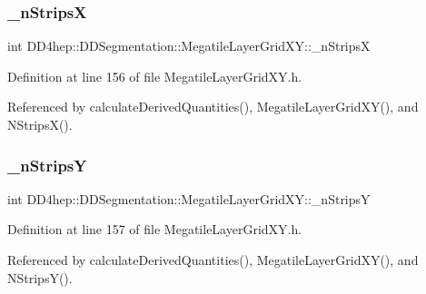 \subsubsection{\texorpdfstring{\+\_\+n\+StripsX}{\_nStripsX}}
{\footnotesize\ttfamily int D\+D4hep\+::\+D\+D\+Segmentation\+::\+Megatile\+Layer\+Grid\+X\+Y\+::\+\_\+n\+StripsX\hspace{0.3cm}{\ttfamily [protected]}}



Definition at line 156 of file Megatile\+Layer\+Grid\+X\+Y.\+h.



Referenced by calculate\+Derived\+Quantities(), Megatile\+Layer\+Grid\+X\+Y(), and N\+Strips\+X().

\hypertarget{class_d_d4hep_1_1_d_d_segmentation_1_1_megatile_layer_grid_x_y_a7d809f0a8f30db5a803be80e2ca833a6}{}\label{class_d_d4hep_1_1_d_d_segmentation_1_1_megatile_layer_grid_x_y_a7d809f0a8f30db5a803be80e2ca833a6} 
\subsubsection{\texorpdfstring{\+\_\+n\+StripsY}{\_nStripsY}}
{\footnotesize\ttfamily int D\+D4hep\+::\+D\+D\+Segmentation\+::\+Megatile\+Layer\+Grid\+X\+Y\+::\+\_\+n\+StripsY\hspace{0.3cm}{\ttfamily [protected]}}



Definition at line 157 of file Megatile\+Layer\+Grid\+X\+Y.\+h.



Referenced by calculate\+Derived\+Quantities(), Megatile\+Layer\+Grid\+X\+Y(), and N\+Strips\+Y().

\hypertarget{class_d_d4hep_1_1_d_d_segmentation_1_1_megatile_layer_grid_x_y_a70c7ce913e3a2038712e9f46e8a6cfb1}{}\label{class_d_d4hep_1_1_d_d_segmentation_1_1_megatile_layer_grid_x_y_a70c7ce913e3a2038712e9f46e8a6cfb1} 
